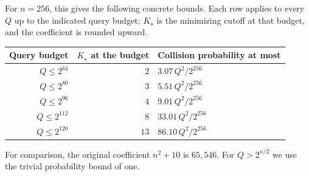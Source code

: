 \documentclass[11pt,letterpaper]{article}
\theoremstyle{definition} %
\begin{document}
For $n=256$, this gives the following concrete bounds. Each row applies
to every $Q$ up to the indicated query budget; $K_\star$ is the
minimizing cutoff at that budget, and the coefficient is rounded upward.
\begin{center}
\begin{tabular}{@{}rrl@{}}
\toprule
Query budget & $K_\star$ at the budget & Collision probability at most\\
\midrule
$Q\leq2^{64}$  & $2$  & $3.07\,Q^2/2^{256}$\\
$Q\leq2^{80}$  & $3$  & $5.51\,Q^2/2^{256}$\\
$Q\leq2^{96}$  & $4$  & $9.01\,Q^2/2^{256}$\\
$Q\leq2^{112}$ & $8$  & $33.01\,Q^2/2^{256}$\\
$Q\leq2^{120}$ & $13$ & $86.10\,Q^2/2^{256}$\\
\bottomrule
\end{tabular}
\end{center}
For comparison, the original coefficient $n^2+10$ is $65{,}546$.
For $Q>2^{n/2}$ we use the trivial probability bound of one.
\end{document}
